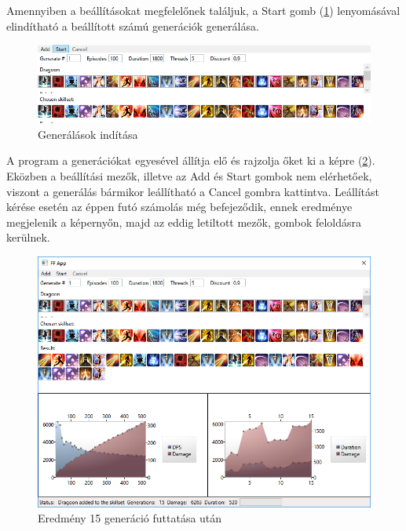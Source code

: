 \documentclass[12pt]{article}
\begin{document}
Amennyiben a beállításokat megfelelőnek találjuk, a Start gomb (\ref{fig:startgen}) lenyomásával elindítható a beállított számú generációk generálása. 

\begin{figure}[H]
	\begin{center}
		\includegraphics[width=1\textwidth]{startgen}
	\end{center}
	\caption{Generálások indítása}
	\label{fig:startgen}
\end{figure}

A program a generációkat egyesével állítja elő és rajzolja őket ki a képre (\ref{fig:15gen}). Eközben a beállítási mezők, illetve az Add és Start gombok nem elérhetőek, viszont a generálás bármikor leállítható a Cancel gombra kattintva.
Leállítást kérése esetén az éppen futó számolás még befejeződik, ennek eredménye megjelenik a képernyőn, majd az eddig letiltott mezők, gombok feloldásra kerülnek.

\begin{figure}[H]
	\begin{center}
		\includegraphics[width=1\textwidth]{15gen}
	\end{center}
	\caption{Eredmény 15 generáció futtatása után}
	\label{fig:15gen}
\end{figure}
\end{document}
